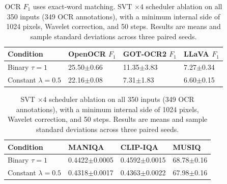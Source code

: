 \begin{table}[H]
\centering
\caption{OCR $F_1$ uses exact-word matching. SVT $\times4$ scheduler ablation on all 350 inputs (349 OCR annotations), with a minimum internal side of 1024 pixels, Wavelet correction, and 50 steps. Results are means and sample standard deviations across three paired seeds.}
\label{tab:ar-svt-scheduler-ocr}
\small
\setlength{\tabcolsep}{4pt}
\begin{tabular}{llll}
\toprule
Condition & OpenOCR $F_1$ & GOT-OCR2 $F_1$ & LLaVA $F_1$ \\
\midrule
Binary $\tau=1$ & 25.50$\pm$0.66 & 11.35$\pm$3.83 & 7.27$\pm$0.34 \\
Constant $\lambda=0.5$ & 22.16$\pm$0.08 & 7.31$\pm$1.83 & 6.60$\pm$0.15 \\
\bottomrule
\end{tabular}
\end{table}

\begin{table}[H]
\centering
\caption{SVT $\times4$ scheduler ablation on all 350 inputs (349 OCR annotations), with a minimum internal side of 1024 pixels, Wavelet correction, and 50 steps. Results are means and sample standard deviations across three paired seeds.}
\label{tab:ar-svt-scheduler-iqa}
\small
\setlength{\tabcolsep}{4pt}
\begin{tabular}{llll}
\toprule
Condition & MANIQA & CLIP-IQA & MUSIQ \\
\midrule
Binary $\tau=1$ & 0.4422$\pm$0.0005 & 0.4592$\pm$0.0015 & 68.78$\pm$0.16 \\
Constant $\lambda=0.5$ & 0.4318$\pm$0.0017 & 0.4363$\pm$0.0022 & 67.98$\pm$0.16 \\
\bottomrule
\end{tabular}
\end{table}
